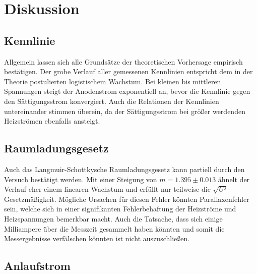 %

%
\section{Diskussion}
\label{sec:Diskussion}
 
\subsection{Kennlinie}

Allgemein lassen sich alle Grundsätze der theoretischen Vorhersage empirisch bestätigen. Der grobe Verlauf aller gemessenen Kennlinien
entspricht dem in der Theorie postulierten logistischem Wachstum. Bei kleinen bis mittleren Spannungen steigt der Anodenstrom exponentiell
an, bevor die Kennlinie gegen den Sättigungsstrom konvergiert. Auch die Relationen der Kennlinien untereinander stimmen überein, da der Sättigungsstrom 
bei größer werdenden Heizströmen ebenfalls ansteigt.

\subsection{Raumladungsgesetz}

Auch das Langmuir-Schottkysche Raumladungsgesetz kann partiell durch den Versuch bestätigt werden. Mit einer Steigung von 
$m = 1.395\pm0.013$ ähnelt der Verlauf eher einem linearen Wachstum und erfüllt nur teilweise die $\sqrt{U³}$-Gesetzmäßigkeit.
Mögliche Ursachen für diesen Fehler könnten Parallaxenfehler sein, welche sich in einer signifikanten Fehlerbehaftung der Heizströme 
und Heizspannungen bemerkbar macht. Auch die Tatsache, dass sich einige Milliampere über die Messzeit gesammelt haben könnten und somit 
die Messergebnisse verfälschen könnten ist nicht auszuschließen.

\subsection{Anlaufstrom}

